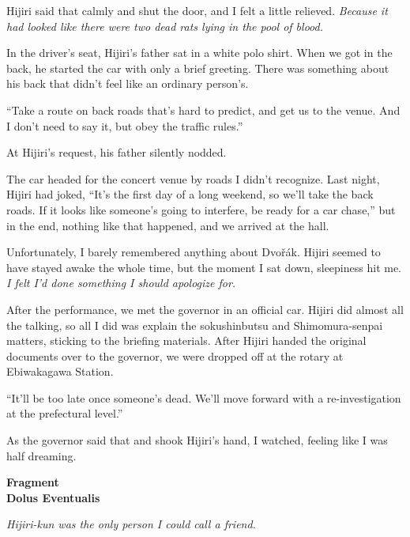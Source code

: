 \documentclass[
    a4paper,
    12pt,
    twoside,
    openany,
    UTF8,
    fontset=windows
]{ctexbook}
\begin{document}
Hijiri said that calmly and shut the door, and I felt a little relieved.
\textit{Because it had looked like there were two dead rats lying in the pool of blood.}

In the driver's seat, Hijiri's father sat in a white polo shirt. When we got in the back, he started the car with only a brief greeting. There was something about his back that didn't feel like an ordinary person's.

``Take a route on back roads that's hard to predict, and get us to the venue. And I don't need to say it, but obey the traffic rules.''

At Hijiri's request, his father silently nodded.

The car headed for the concert venue by roads I didn't recognize. Last night, Hijiri had joked, ``It's the first day of a long weekend, so we'll take the back roads. If it looks like someone's going to interfere, be ready for a car chase,'' but in the end, nothing like that happened, and we arrived at the hall.

Unfortunately, I barely remembered anything about Dvo\v{r}\'ak. Hijiri seemed to have stayed awake the whole time, but the moment I sat down, sleepiness hit me. \textit{I felt I'd done something I should apologize for.}

After the performance, we met the governor in an official car. Hijiri did almost all the talking, so all I did was explain the sokushinbutsu and Shimomura-senpai matters, sticking to the briefing materials. After Hijiri handed the original documents over to the governor, we were dropped off at the rotary at Ebiwakagawa Station.

``It'll be too late once someone's dead. We'll move forward with a re-investigation at the prefectural level.''

As the governor said that and shook Hijiri's hand, I watched, feeling like I was half dreaming.


\clearpage
\thispagestyle{plain}
\begin{center}
    \large\bfseries
    Fragment\\
    Dolus Eventualis
\end{center}
\label{sec:fragDolus}
\vspace{1cm}

\textit{Hijiri-kun was the only person I could call a friend.}
\end{document}
